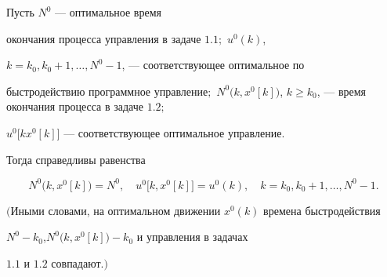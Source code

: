 \begin{thms}


Пусть $N^0$ --- оптимальное время


окончания процесса управления в задаче $1.1;$ $u^0(k)$,


$k=k_0, k_0+1,\dotsc, N^0-1$, --- соответствующее оптимальное по


быстродействию программное управление$;$ $N^0\bigl(k, x^0[k]\bigr)$, $k\ge


k_0$, --- время окончания процесса в задаче $1.2;$


$u^0\bigl[k x^0[k]\bigr]$ --- соответствующее оптимальное управление.


Тогда справедливы равенства


$$


N^0\bigl(k, x^0[k]\bigr)=N^0,\quad


u^0\bigl[k,x^0[k]\bigr]=u^0(k),\quad k=k_0, k_0+1,\dotsc, N^0-1.


$$


$($Иными словами, на оптимальном движении $x^0(k)$ времена быстродействия


$N^0-k_0$,\linebreak $N^0\bigl(k, x^0[k]\bigr)-k_0$ и управления в задачах


$1.1$ и $1.2$ совпадают.$)$


\end{thms}





